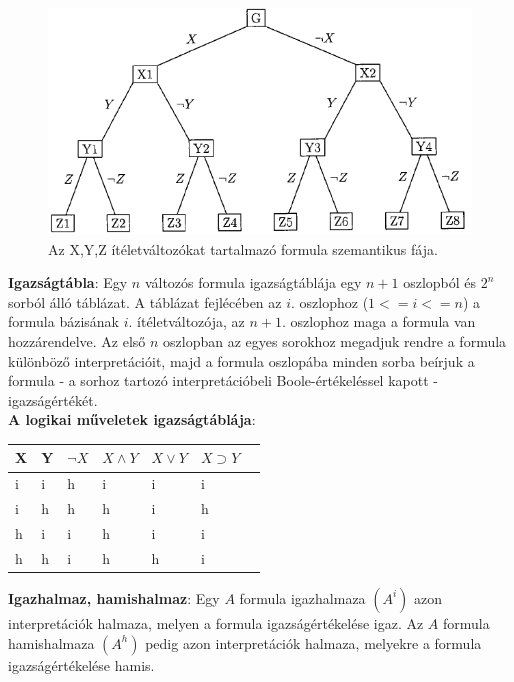 \documentclass[margin=0px]{article}
\begin{document}
\begin{figure}[H]
    \centering
    \includegraphics[width=0.6\linewidth]{img/szemantikusfa}
    \caption{Az X,Y,Z ítéletváltozókat tartalmazó formula szemantikus fája.}
    \label{fig:szemantikusfa}
\end{figure}

\noindent \textbf{Igazságtábla}: Egy $n$ változós formula igazságtáblája egy $n+1$ oszlopból és $2^{n}$ sorból álló táblázat.
A táblázat fejlécében az $i$. oszlophoz ($1<=i<=n$) a formula bázisának $i$. ítéletváltozója, az $n+1$. oszlophoz maga a formula
van hozzárendelve. Az első $n$ oszlopban az egyes sorokhoz megadjuk rendre a formula különböző interpretációit, majd a formula
oszlopába minden sorba beírjuk a formula - a sorhoz tartozó interpretációbeli Boole-értékeléssel kapott - igazságértékét.\\

\noindent \textbf{A logikai műveletek igazságtáblája}:

\begin{table}[H]
    \begin{tabular}{ll|lllll}
        X & Y & $\neg X$ & $X \wedge Y$ & $X \vee Y$ & $ X \supset Y$ & \\ \hline
        i & i & h        & i            & i          & i              & \\
        i & h & h        & h            & i          & h              & \\
        h & i & i        & h            & i          & i              & \\
        h & h & i        & h            & h          & i              &
    \end{tabular}
\end{table}

\noindent \textbf{Igazhalmaz, hamishalmaz}: Egy $A$ formula igazhalmaza $(A^{i})$
azon interpretációk halmaza, melyen a formula igazságértékelése igaz. Az $A$ formula
hamishalmaza $(A^{h})$ pedig azon interpretációk halmaza, melyekre a formula igazságértékelése hamis.\\
\end{document}
